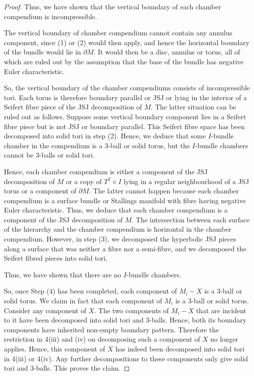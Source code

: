 \documentclass[oneside]{amsart}
\numberwithin{equation}{section}
\theoremstyle{plain}
\theoremstyle{definition}
\begin{document}
\begin{proof}
Thus, we have shown that the vertical boundary of each chamber compendium is incompressible. 

The vertical boundary of chamber compendium cannot contain any annulus component, since (1) or (2) would then apply, and hence the horizontal boundary of the bundle would lie in $\partial M$. It would then be a disc, annulus or torus, all of which are ruled out by the assumption that the base of the bundle has negative Euler characteristic.

So, the vertical boundary of the chamber compendiums consists of incompressible tori. Each torus is therefore boundary parallel or JSJ or lying in the interior of a Seifert fibre piece of the JSJ decomposition of $M$. The latter situation can be ruled out as follows. Suppose some vertical boundary component lies in a Seifert fibre piece but is not JSJ or boundary parallel. This Seifert fibre space has been decomposed into solid tori in step (2). Hence, we deduce that some $I$-bundle chamber in the compendium is a 3-ball or solid torus, but the $I$-bundle chambers cannot be 3-balls or solid tori.

Hence, each chamber compendium is either a component of the JSJ decomposition of $M$ or a copy of $T^2 \times I$ lying in a regular neighbourhood of a JSJ torus or a component of $\partial M$. The latter cannot happen because each chamber compendium is a surface bundle or Stallings manifold with fibre having negative Euler characteristic. Thus, we deduce that each chamber compendium is a component of the JSJ decomposition of $M$. The intersection between each surface of the hierarchy and the chamber compendium is horizontal in the chamber compendium. However, in step (3), we decomposed the hyperbolic JSJ pieces along a surface that was neither a fibre nor a semi-fibre, and we decomposed the Seifert fibred pieces into solid tori.

Thus, we have shown that there are no $I$-bundle chambers.

So, once Step (4) has been completed, each component of $M_i - X$ is a 3-ball or solid torus. We claim in fact that each component of $M_i$ is a 3-ball or solid torus. Consider any component of $X$. The two components of $M_i - X$ that are incident to it have been decomposed into solid tori and 3-balls. Hence, both its boundary components have inherited non-empty boundary pattern. Therefore the restriction in 4(iii) and (iv) on decomposing such a component of $X$ no longer applies. Hence, this component of $X$ has indeed been decomposed into solid tori in 4(iii) or 4(iv). Any further decompositions to these components only give solid tori and 3-balls. This proves the claim.


\end{proof}
\end{document}
